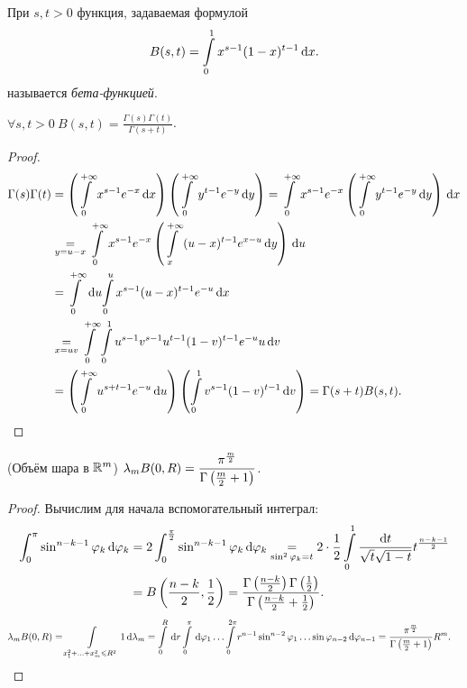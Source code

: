 \begin{definition}
    При $s, t > 0$ функция, задаваемая формулой
    \[
        B(s, t) = \int\limits_0^1{x^{s - 1} (1 - x)^{t - 1} \,\mathrm{d} x}
    .\]
    называется \textit{бета-функцией}.
\end{definition}

\begin{theorem}
    $\displaystyle \forall s, t > 0~ B(s, t) = \frac{\Gamma(s) \Gamma(t)}{\Gamma(s + t)}$.
\end{theorem}
\begin{proof}
    \begin{align*}
        \Gamma(s) \Gamma(t) 
        &= \left( \int\limits_{0}^{+\infty}{x^{s - 1} e^{-x} \,\mathrm{d} x} \right) 
        \left( \int\limits_{0}^{+\infty}{y^{t - 1} e^{-y} \,\mathrm{d} y} \right)
        = \int\limits_0^{+\infty}{x^{s - 1} e^{-x} \left( \int\limits_0^{+\infty}{y^{t - 1} e^{-y} \,\mathrm{d} y} \right) \,\mathrm{d} x} \\
        &\underset{y = u - x}{=}
        \int\limits_0^{+\infty}{x^{s - 1} e^{-x} \left( \int\limits_x^{+\infty}{
        (u - x)^{t - 1} e^{x - u} \,\mathrm{d} y} \right) \,\mathrm{d} u} \\
        &= \int\limits_0^{+\infty}{\,\mathrm{d} u}{\int\limits_0^{u}{x^{s - 1} (u - x)^{t - 1} e^{-u} \,\mathrm{d} x}} \\
        &\underset{x = uv}{=} \int\limits_0^{+\infty}{\int\limits_0^1{u^{s - 1}v^{s - 1} 
        u^{t - 1} (1 - v)^{t - 1} e^{-u} u \,\mathrm{d} v}} \\
        &= \left( \int\limits_0^{+\infty}{u^{s + t - 1} e^{-u} \,\mathrm{d} u} \right) 
        \left( \int\limits_0^1{v^{s - 1} (1 - v)^{t - 1} \,\mathrm{d} v} \right) = \Gamma(s + t) B(s, t)
    .\end{align*}
\end{proof}

\begin{theorem}(Объём шара в $\mathbb{R}^m$)
    $\displaystyle \lambda_m{B(0, R)} = \frac{\pi^{\frac{m}{2}}}{\Gamma\left( \frac{m}{2} + 1 \right)}$.  
\end{theorem}
\begin{proof}
    Вычислим для начала вспомогательный интеграл:
    \begin{align*}
        \int_0^{\pi}{\sin^{n - k - 1}{\varphi_k} \,\mathrm{d}\varphi_k} 
        &= 2 \int_0^{\frac{\pi}{2}}{\sin^{n - k - 1}{\varphi_k} \,\mathrm{d}\varphi_k}
        \underset{\sin^2{\varphi_k} = t}{=} 2 \cdot \frac{1}{2} \int\limits_0^1
        {\frac{\mathrm{d} t}{\sqrt{t} \sqrt{1 - t}} t^{\frac{n - k - 1}{2}}} \\
        &= B\left( \frac{n - k}{2}, \frac{1}{2} \right) = \frac{\Gamma\left( \frac{n - k}{2} \right) \Gamma\left( \frac{1}{2} \right)}
        {\Gamma\left( \frac{n - k}{2} + \frac{1}{2} \right)}
    .\end{align*}
    \begin{align*}
        \lambda_m{B(0, R)} &= \int\limits_{x_1^2 + \ldots + x_m^2 \leqslant R^2}{1 \,\mathrm{d} \lambda_m}
                           = \int\limits_0^R{\,\mathrm{d} r \int\limits_0^{\pi}{\,\mathrm{d} \varphi_1 \ldots \int\limits_0^{2 \pi}
                           {r^{n - 1} \sin^{n - 2}{\varphi_1} \ldots \sin{\varphi_{n - 2}} \,\mathrm{d} \varphi_{n - 1}}}}
                           = \frac{\pi^{\frac{m}{2}}}{\Gamma\left( \frac{m}{2} + 1 \right)}R^m
    .\end{align*}
\end{proof}

